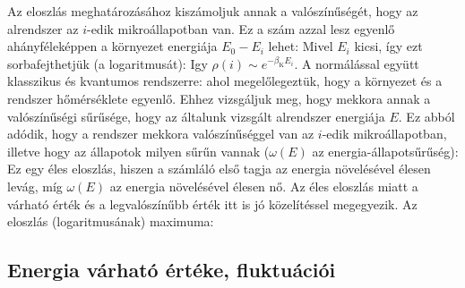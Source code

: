    Az eloszlás meghatározásához kiszámoljuk annak a valószínűségét, hogy az alrendszer az $i$-edik mikroállapotban van.
   Ez a szám azzal lesz egyenlő ahányféleképpen a környezet energiája $E_0-E_i$ lehet:
   Mivel $E_i$ kicsi, így ezt sorbafejthetjük (a logaritmusát):
   Igy $\rho(i)\sim e^{-\beta_\text{K} E_i}$.
   A normálással együtt klasszikus és kvantumos rendszerre:
   ahol megelőlegeztük, hogy a környezet és a rendszer hőmérséklete egyenlő.
   Ehhez vizsgáljuk meg, hogy mekkora annak a valószínűségi sűrűsége, hogy az általunk vizsgált alrendszer energiája $E$.
   Ez abból adódik, hogy a rendszer mekkora valószínűséggel van az $i$-edik mikroállapotban, illetve hogy az állapotok milyen sűrűn vannak ($\omega(E)$ az energia-állapotsűrűség): 
   Ez egy éles eloszlás, hiszen a számláló első tagja az energia növelésével élesen levág, míg $\omega(E)$ az energia növelésével élesen nő.
   Az éles eloszlás miatt a várható érték és a legvalószínűbb érték itt is jó közelítéssel megegyezik.
   Az eloszlás (logaritmusának) maximuma:
  
  \subsection{Energia várható értéke, fluktuációi}
   
